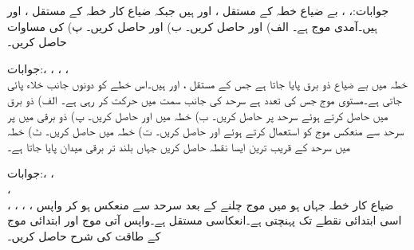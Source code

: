 جوابات:، ، 
بے ضیاع خطہ  کے مستقل ،  اور  ہیں جبکہ ضیاع کار خطہ  کے مستقل ،  اور  ہیں۔آمدی موج  ہے۔ الف)  اور  حاصل کریں۔ ب)  اور
  حاصل کریں۔ پ)  کی مساوات حاصل کریں۔

جوابات:، ، ، ،\\
خطہ  میں بے ضیاع ذو برق پایا جاتا ہے جس  کے مستقل ،  اور  ہیں۔اس خطے کو دونوں جانب خلاء پائی جاتی ہے۔مستوی موج جس کی تعدد  ہے سرحد  کی جانب  سمت میں حرکت کر رہی ہے۔ الف)  ذو برق میں  حاصل کرتے ہوئے سرحد  پر  حاصل کریں۔ ب) خطہ  میں  اور  حاصل کریں۔ پ) ذو برقی میں  پر سرحد سے منعکس موج کو استعمال کرتے ہوئے  اور  حاصل کریں۔ ت) خطہ  میں  حاصل کریں۔ ٹ) خطہ  میں سرحد کے قریب ترین ایسا نقطہ حاصل کریں جہاں بلند تر برقی میدان پایا جاتا ہے۔ 

جوابات:، ، \\ ، \\ ، ، ، ، 
ضیاع کار خطہ جہاں  ہو میں موج  چلنے کے بعد سرحد سے منعکس ہو کر واپس اسی ابتدائی نقطے تک پہنچتی ہے۔انعکاسی مستقل  ہے۔واپس آتی موج اور ابتدائی موج کے طاقت کی شرح حاصل کریں۔

